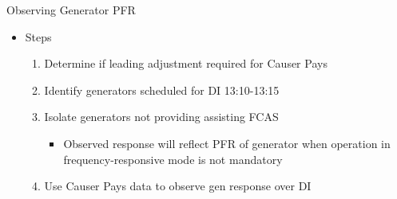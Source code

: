 \begin{frame}{Observing Generator PFR}
\begin{itemize}
\item Steps
    \begin{enumerate}
        \item Determine if leading adjustment required for Causer Pays
        \item Identify generators scheduled for DI 13:10-13:15
        \item Isolate generators not providing assisting FCAS
        \begin{itemize}
            \item Observed response will reflect PFR of generator when operation in frequency-responsive mode is not mandatory
        \end{itemize}
        \item Use Causer Pays data to observe gen response over DI
    \end{enumerate}
  \end{itemize}
 
 \end{frame}
